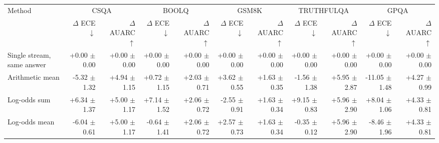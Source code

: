 \begin{tabular}{lrrrrrrrrrr}
\toprule
Method & \multicolumn{2}{c}{CSQA} & \multicolumn{2}{c}{BOOLQ} & \multicolumn{2}{c}{GSM8K} & \multicolumn{2}{c}{TRUTHFULQA} & \multicolumn{2}{c}{GPQA} \\
 & $\Delta$ ECE $\downarrow$ & $\Delta$ AUARC $\uparrow$ & $\Delta$ ECE $\downarrow$ & $\Delta$ AUARC $\uparrow$ & $\Delta$ ECE $\downarrow$ & $\Delta$ AUARC $\uparrow$ & $\Delta$ ECE $\downarrow$ & $\Delta$ AUARC $\uparrow$ & $\Delta$ ECE $\downarrow$ & $\Delta$ AUARC $\uparrow$ \\
\midrule
Single stream, same answer & +0.00 {\scriptsize $\pm$ 0.00} & +0.00 {\scriptsize $\pm$ 0.00} & +0.00 {\scriptsize $\pm$ 0.00} & +0.00 {\scriptsize $\pm$ 0.00} & +0.00 {\scriptsize $\pm$ 0.00} & +0.00 {\scriptsize $\pm$ 0.00} & +0.00 {\scriptsize $\pm$ 0.00} & +0.00 {\scriptsize $\pm$ 0.00} & +0.00 {\scriptsize $\pm$ 0.00} & +0.00 {\scriptsize $\pm$ 0.00} \\
Arithmetic mean & -5.32 {\scriptsize $\pm$ 1.32} & +4.94 {\scriptsize $\pm$ 1.15} & +0.72 {\scriptsize $\pm$ 1.15} & +2.03 {\scriptsize $\pm$ 0.71} & +3.62 {\scriptsize $\pm$ 0.55} & +1.63 {\scriptsize $\pm$ 0.35} & -1.56 {\scriptsize $\pm$ 1.38} & +5.95 {\scriptsize $\pm$ 2.87} & -11.05 {\scriptsize $\pm$ 1.48} & +4.27 {\scriptsize $\pm$ 0.99} \\
Log-odds sum & +6.34 {\scriptsize $\pm$ 1.37} & +5.00 {\scriptsize $\pm$ 1.17} & +7.14 {\scriptsize $\pm$ 1.52} & +2.06 {\scriptsize $\pm$ 0.72} & -2.55 {\scriptsize $\pm$ 0.91} & +1.63 {\scriptsize $\pm$ 0.34} & +9.15 {\scriptsize $\pm$ 0.83} & +5.96 {\scriptsize $\pm$ 2.90} & +8.04 {\scriptsize $\pm$ 1.06} & +4.33 {\scriptsize $\pm$ 0.81} \\
Log-odds mean & -6.04 {\scriptsize $\pm$ 0.61} & +5.00 {\scriptsize $\pm$ 1.17} & -0.64 {\scriptsize $\pm$ 1.41} & +2.06 {\scriptsize $\pm$ 0.72} & +2.57 {\scriptsize $\pm$ 0.73} & +1.63 {\scriptsize $\pm$ 0.34} & -0.35 {\scriptsize $\pm$ 0.12} & +5.96 {\scriptsize $\pm$ 2.90} & -8.46 {\scriptsize $\pm$ 1.96} & +4.33 {\scriptsize $\pm$ 0.81} \\

\end{tabular}
